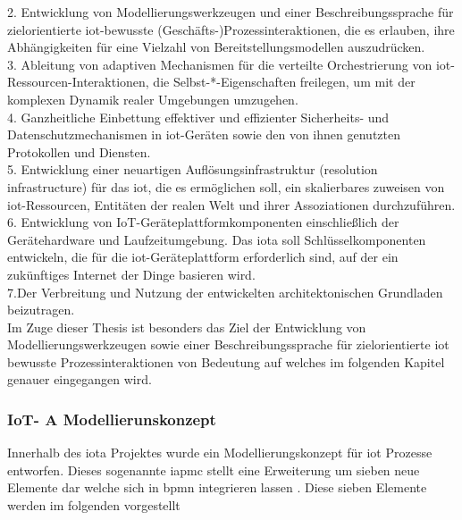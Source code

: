 \documentclass[a4paper, 12pt, twoside, headsepline=true]{scrartcl} %
\begin{document}
2. Entwicklung von Modellierungswerkzeugen und einer Beschreibungssprache für zielorientierte \ac{iot}-bewusste (Geschäfts-)Prozessinteraktionen, die es erlauben, ihre Abhängigkeiten für eine Vielzahl von Bereitstellungsmodellen auszudrücken.
\\

3. Ableitung von adaptiven Mechanismen für die verteilte Orchestrierung von \ac{iot}-Ressourcen-Interaktionen, die Selbst-*-Eigenschaften freilegen, um mit der komplexen Dynamik realer Umgebungen umzugehen. 
\\

4. Ganzheitliche Einbettung effektiver und effizienter Sicherheits- und Datenschutzmechanismen in \ac{iot}-Geräten sowie den von ihnen genutzten Protokollen und Diensten.
\\

5. Entwicklung einer neuartigen Auflösungsinfrastruktur (resolution infrastructure) für das \ac{iot}, die es ermöglichen soll, ein skalierbares zuweisen von \ac{iot}-Ressourcen, Entitäten der realen Welt und ihrer Assoziationen durchzuführen.
\\

6. Entwicklung von IoT-Geräteplattformkomponenten einschließlich der Gerätehardware und Laufzeitumgebung. Das \ac{iota} soll Schlüsselkomponenten entwickeln, die für die \ac{iot}-Geräteplattform erforderlich sind, auf der ein zukünftiges Internet der Dinge basieren wird. 
\\

7.Der Verbreitung und Nutzung der entwickelten architektonischen Grundladen beizutragen.
\\

Im Zuge dieser Thesis ist besonders das Ziel der Entwicklung von Modellierungswerkzeugen sowie einer Beschreibungssprache für zielorientierte \ac{iot} bewusste Prozessinteraktionen von Bedeutung auf welches im folgenden Kapitel genauer eingegangen wird. 

\subsubsection{IoT- A Modellierunskonzept}
Innerhalb des \ac{iota} Projektes wurde ein Modellierungskonzept für \ac{iot} Prozesse entworfen. Dieses sogenannte \ac{iapmc} stellt eine Erweiterung um sieben neue Elemente dar welche sich in \ac{bpmn} integrieren lassen  \cite{conceptsiotawarepm}. Diese sieben Elemente werden im folgenden vorgestellt
\newline
\end{document}

